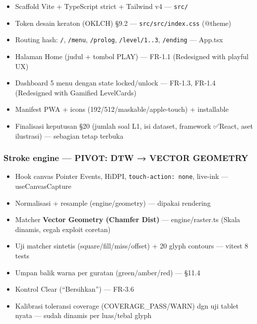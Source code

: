 \documentclass[
  11pt,
]{article}
\providecommand{\tightlist}{%
  \setlength{\itemsep}{0pt}\setlength{\parskip}{0pt}}
\begin{document}
\begin{itemize}
\tightlist
\item[$\boxtimes$]
  Scaffold Vite + TypeScript strict + Tailwind v4 --- \texttt{src/}
\item[$\boxtimes$]
  Token desain keraton (OKLCH) §9.2 --- \texttt{src/src/index.css}
  (@theme)
\item[$\boxtimes$]
  Routing hash: \texttt{/}, \texttt{/menu}, \texttt{/prolog},
  \texttt{/level/1..3}, \texttt{/ending} --- App.tsx
\item[$\boxtimes$]
  Halaman Home (judul + tombol PLAY) --- FR-1.1 (Redesigned with playful
  UX)
\item[$\boxtimes$]
  Dashboard 5 menu dengan state locked/unlock --- FR-1.3, FR-1.4
  (Redesigned with Gamified LevelCards)
\item[$\boxtimes$]
  Manifest PWA + icons (192/512/maskable/apple-touch) + installable
\item[$\square$]
  Finalisasi keputusan §20 (jumlah soal L1, isi dataset, framework
  ✅React, aset ilustrasi) --- sebagian tetap terbuka
\end{itemize}

\subsubsection{Stroke engine --- PIVOT: DTW → VECTOR
GEOMETRY}\label{stroke-engine-pivot-dtw-vector-geometry}

\begin{itemize}
\tightlist
\item[$\boxtimes$]
  Hook canvas Pointer Events, HiDPI, \texttt{touch-action:\ none},
  live-ink --- useCanvasCapture
\item[$\boxtimes$]
  Normalisasi + resample (engine/geometry) --- dipakai rendering
\item[$\boxtimes$]
  Matcher \textbf{Vector Geometry (Chamfer Dist)} --- engine/raster.ts
  (Skala dinamis, cegah exploit coretan)
\item[$\boxtimes$]
  Uji matcher sintetis (square/fill/miss/offset) + 20 glyph contours ---
  vitest 8 tests
\item[$\boxtimes$]
  Umpan balik warna per guratan (green/amber/red) --- §11.4
\item[$\boxtimes$]
  Kontrol Clear (``Bersihkan'') --- FR-3.6
\item[$\boxtimes$]
  Kalibrasi toleransi coverage (COVERAGE\_PASS/WARN) dgn uji tablet
  nyata --- sudah dinamis per luas/tebal glyph
\end{itemize}
\end{document}
